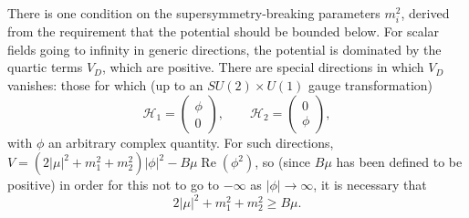 There is one condition on the supersymmetry-breaking parameters \(m_i^2\),
derived from the requirement that the potential should be bounded below.
For scalar fields going to infinity in generic directions, the potential
is dominated by the quartic terms \(V_D\), which are positive. There are
special directions in which \(V_D\) vanishes: those for which (up to an
\(SU(2)\times U(1)\) gauge transformation)
\[
  \mathcal{H}_1=
  \begin{pmatrix}
    \phi\\
    0
  \end{pmatrix},
  \qquad
  \mathcal{H}_2=
  \begin{pmatrix}
    0\\
    \phi
  \end{pmatrix},
\]
with \(\phi\) an arbitrary complex quantity. For such directions,
\(V=(2|\mu|^2+m_1^2+m_2^2)|\phi|^2-B\mu\operatorname{Re}(\phi^2)\), so (since \(B\mu\)
has been defined to be positive) in order for this not to go to
\(-\infty\) as \(|\phi|\longrightarrow\infty\), it is necessary that
\begin{equation}
  2|\mu|^2+m_1^2+m_2^2\geq B\mu.
  \tag{28.5.11}\label{eq:28.5.11}
\end{equation}

